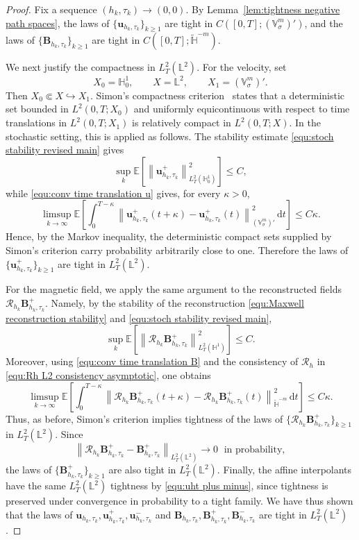\documentclass[11pt, reqno]{amsart}
\theoremstyle{definition}
\numberwithin{equation}{section}
\newcommand{\bff}{\boldsymbol}
\newcommand{\bb}{\mathbb}
\newcommand{\dt}{\,\mathrm{d}t}
\newcommand{\norm}[2]{\left\|{#1}\right\|_{#2}}
\begin{document}
\begin{proof}
	Fix a sequence $(h_k,\tau_k)\to(0,0)$. By
	Lemma~\ref{lem:tightness negative path spaces}, the laws of
	$\{\bff u_{h_k,\tau_k}\}_{k\ge1}$ are tight in
	$C([0,T];(\bb V^m_\sigma)')$, and the laws of
	$\{\bff B_{h_k,\tau_k}\}_{k\ge1}$ are tight in
	$C([0,T];\widetilde{\bb H}^{-m})$.
	
	We next justify the compactness in $L^2_T(\bb L^2)$. For the velocity, set
	\[
	X_0=\bb H_0^1,\qquad
	X=\bb L^2,\qquad
	X_1=(\bb V^m_\sigma)'.
	\]
	Then $X_0\Subset X\hookrightarrow X_1$.
	Simon's compactness criterion~\cite{Sim87} states that a deterministic set
	bounded in $L^2(0,T;X_0)$ and uniformly equicontinuous with respect to time
	translations in $L^2(0,T;X_1)$ is relatively compact in $L^2(0,T;X)$.
	In the stochastic setting, this is applied as follows. The stability
	estimate \eqref{equ:stoch stability revised main} gives
	\[
	\sup_k
	\bb E \left[\norm{\bff u_{h_k,\tau_k}^{+}}{L^2_T(\bb H_0^1)}^2 \right]
	\le C,
	\]
	while \eqref{equ:conv time translation u} gives, for every $\kappa>0$,
	\[
	\limsup_{k\to\infty}
	\bb E \left[
	\int_0^{T-\kappa}
	\norm{
		\bff u_{h_k,\tau_k}^{+}(t+\kappa)
		-
		\bff u_{h_k,\tau_k}^{+}(t)}
	{(\bb V^m_\sigma)'}^2\dt \right]
	\le C\kappa.
	\]
	Hence, by the Markov inequality, the deterministic compact sets supplied by
	Simon's criterion carry probability arbitrarily close to one. Therefore the
	laws of $\{\bff u_{h_k,\tau_k}^{+}\}_{k\ge1}$ are tight in
	$L^2_T(\bb L^2)$.
	
	For the magnetic field, we apply the same argument to the reconstructed
	fields $\mathcal R_{h_k}\bff B_{h_k,\tau_k}^{+}$. Namely, by the stability of
	the reconstruction \eqref{equ:Maxwell reconstruction stability} and \eqref{equ:stoch stability revised main},
	\[
	\sup_k
	\bb E \left[ \norm{\mathcal R_{h_k}\bff B_{h_k,\tau_k}^{+}}{L^2_T(\bb H^1)}^2 \right]
	\le C.
	\]
	Moreover, using \eqref{equ:conv time translation B} and the consistency of
	$\mathcal R_h$ in \eqref{equ:Rh L2 consistency asymptotic}, one obtains
	\[
	\limsup_{k\to\infty}
	\bb E \left[
	\int_0^{T-\kappa}
	\norm{
		\mathcal R_{h_k}\bff B_{h_k,\tau_k}^{+}(t+\kappa)
		-
		\mathcal R_{h_k}\bff B_{h_k,\tau_k}^{+}(t)}
	{\widetilde{\bb H}^{-m}}^2\dt \right]
	\le C\kappa .
	\]
	Thus, as before, Simon's criterion implies tightness
	of the laws of
	$\{\mathcal R_{h_k}\bff B_{h_k,\tau_k}^{+}\}_{k\ge1}$ in
	$L^2_T(\bb L^2)$. Since
	\[
	\norm{
		\mathcal R_{h_k}\bff B_{h_k,\tau_k}^{+}
		-
		\bff B_{h_k,\tau_k}^{+}}
	{L^2_T(\bb L^2)}
	\longrightarrow 0 \;\text{ in probability},
	\]
	the laws of $\{\bff B_{h_k,\tau_k}^{+}\}_{k\ge1}$ are also
	tight in $L^2_T(\bb L^2)$.
	Finally, the affine interpolants have the same $L^2_T(\bb L^2)$ tightness by \eqref{equ:uht plus minus}, since tightness is preserved under convergence in probability to a tight family. We have thus shown that the laws of $\bff u_{h_k,\tau_k},
	\bff u_{h_k,\tau_k}^{+},
	\bff u_{h_k,\tau_k}^{-}$
	and $\bff B_{h_k,\tau_k},
	\bff B_{h_k,\tau_k}^{+},
	\bff B_{h_k,\tau_k}^{-}$
	are tight in $L^2_T(\bb L^2)$.
	

\end{proof}
\end{document}
